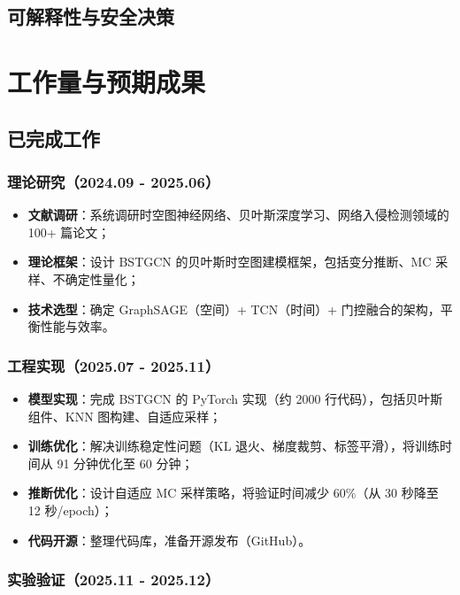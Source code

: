 \subsection{可解释性与安全决策}




\section{工作量与预期成果}

\subsection{已完成工作}

\subsubsection{理论研究（2024.09 - 2025.06）}

\begin{itemize}
  \item \textbf{文献调研}：系统调研时空图神经网络、贝叶斯深度学习、网络入侵检测领域的 100+ 篇论文；
  \item \textbf{理论框架}：设计 BSTGCN 的贝叶斯时空图建模框架，包括变分推断、MC 采样、不确定性量化；
  \item \textbf{技术选型}：确定 GraphSAGE（空间）+ TCN（时间）+ 门控融合的架构，平衡性能与效率。
\end{itemize}

\subsubsection{工程实现（2025.07 - 2025.11）}

\begin{itemize}
  \item \textbf{模型实现}：完成 BSTGCN 的 PyTorch 实现（约 2000 行代码），包括贝叶斯组件、KNN 图构建、自适应采样；
  \item \textbf{训练优化}：解决训练稳定性问题（KL 退火、梯度裁剪、标签平滑），将训练时间从 91 分钟优化至 60 分钟；
  \item \textbf{推断优化}：设计自适应 MC 采样策略，将验证时间减少 60\%（从 30 秒降至 12 秒/epoch）；
  \item \textbf{代码开源}：整理代码库，准备开源发布（GitHub）。
\end{itemize}

\subsubsection{实验验证（2025.11 - 2025.12）}

